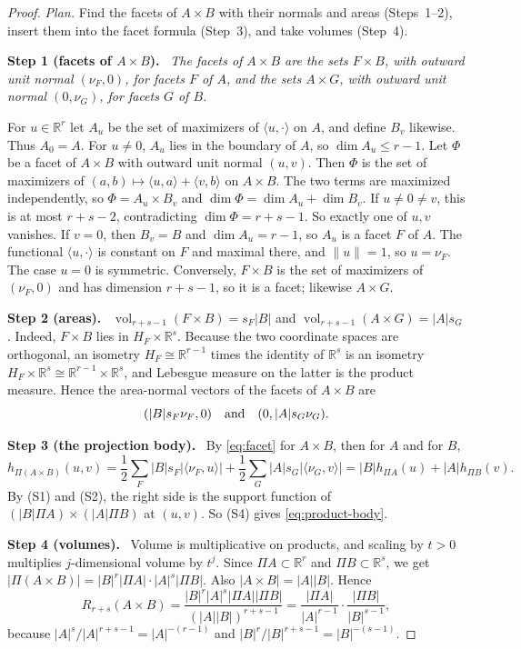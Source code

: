 \documentclass[11pt]{article}
\newcommand{\R}{\mathbb R}
\DeclareMathOperator{\vol}{vol}
\newcommand{\step}[1]{\par\smallskip\noindent\textbf{#1}\ }
\begin{document}
\begin{proof}
\emph{Plan.} Find the facets of \(A\times B\) with their normals and areas
(Steps~1--2), insert them into the facet formula (Step~3), and take volumes
(Step~4).

\step{Step 1 (facets of \(A\times B\)).} \emph{The facets of \(A\times B\)
are the sets \(F\times B\), with outward unit normal \((\nu_F,0)\), for
facets \(F\) of \(A\), and the sets \(A\times G\), with outward unit normal
\((0,\nu_G)\), for facets \(G\) of \(B\).}

For \(u\in\R^r\) let \(A_u\) be the set of maximizers of
\(\langle u,\cdot\rangle\) on \(A\), and define \(B_v\) likewise. Thus
\(A_0=A\). For \(u\ne0\), \(A_u\) lies in the boundary of \(A\), so
\(\dim A_u\le r-1\). Let \(\Phi\) be a facet of \(A\times B\) with outward
unit normal \((u,v)\). Then \(\Phi\) is the set of maximizers of
\((a,b)\mapsto\langle u,a\rangle+\langle v,b\rangle\) on \(A\times B\). The
two terms are maximized independently, so \(\Phi=A_u\times B_v\) and
\(\dim\Phi=\dim A_u+\dim B_v\). If \(u\ne0\ne v\), this is at most
\(r+s-2\), contradicting \(\dim\Phi=r+s-1\). So exactly one of \(u,v\)
vanishes. If \(v=0\), then \(B_v=B\) and \(\dim A_u=r-1\), so \(A_u\) is a
facet \(F\) of \(A\). The functional \(\langle u,\cdot\rangle\) is constant
on \(F\) and maximal there, and \(\|u\|=1\), so \(u=\nu_F\). The case
\(u=0\) is symmetric. Conversely, \(F\times B\) is the set of maximizers of
\((\nu_F,0)\) and has dimension \(r+s-1\), so it is a facet; likewise
\(A\times G\).

\step{Step 2 (areas).}
\(\vol_{r+s-1}(F\times B)=s_F|B|\) and \(\vol_{r+s-1}(A\times G)=|A|s_G\).
Indeed, \(F\times B\) lies in \(H_F\times\R^s\). Because the two coordinate
spaces are orthogonal, an isometry \(H_F\cong\R^{r-1}\) times the identity
of \(\R^s\) is an isometry \(H_F\times\R^s\cong\R^{r-1}\times\R^s\), and
Lebesgue measure on the latter is the product measure. Hence the
area-normal vectors of the facets of \(A\times B\) are
\[
 (|B|s_F\nu_F,0)
 \quad\hbox{and}\quad
 (0,|A|s_G\nu_G).
\]

\step{Step 3 (the projection body).} By \eqref{eq:facet} for \(A\times B\),
then for \(A\) and for \(B\),
\[
 h_{\Pi(A\times B)}(u,v)
 =\frac12\sum_F|B|s_F|\langle\nu_F,u\rangle|
  +\frac12\sum_G|A|s_G|\langle\nu_G,v\rangle|
 =|B|h_{\Pi A}(u)+|A|h_{\Pi B}(v).
\]
By (S1) and (S2), the right side is the support function of
\((|B|\Pi A)\times(|A|\Pi B)\) at \((u,v)\). So (S4) gives
\eqref{eq:product-body}.

\step{Step 4 (volumes).} Volume is multiplicative on products, and scaling
by \(t>0\) multiplies \(j\)-dimensional volume by \(t^j\). Since
\(\Pi A\subset\R^r\) and \(\Pi B\subset\R^s\), we get
\(|\Pi(A\times B)|=|B|^r|\Pi A|\cdot|A|^s|\Pi B|\). Also
\(|A\times B|=|A||B|\). Hence
\[
 R_{r+s}(A\times B)
 =\frac{|B|^r|A|^s|\Pi A||\Pi B|}{(|A||B|)^{r+s-1}}
 =\frac{|\Pi A|}{|A|^{r-1}}\cdot\frac{|\Pi B|}{|B|^{s-1}},
\]
because \(|A|^{s}/|A|^{r+s-1}=|A|^{-(r-1)}\) and
\(|B|^{r}/|B|^{r+s-1}=|B|^{-(s-1)}\).
\end{proof}
\end{document}
